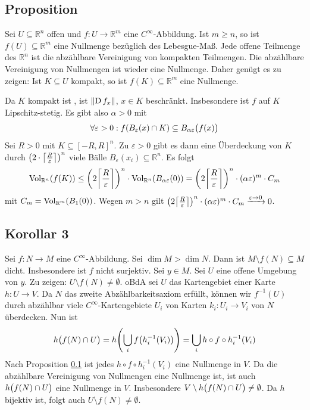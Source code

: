 \subsection{Proposition} %
\label{sub:175}
Sei $U \subseteq \mathds{R}^n$ offen und $f : U \to \mathds{R}^m$ eine $C^\infty$-Abbildung. Ist $m \ge n$, so ist $f(U) \subseteq \mathds{R}^m$ eine Nullmenge bezüglich
des Lebesgue-Maß.
Jede offene Teilmenge des $\mathds{R}^n$ ist die abzählbare Vereinigung von kompakten Teilmengen. Die abzählbare Vereinigung von Nullmengen ist wieder eine Nullmenge. Daher
genügt es zu zeigen: Ist $K \subseteq U$ kompakt, so ist $f(K) \subseteq \mathds{R}^m$ eine Nullmenge. 

Da $K$ kompakt ist , ist $\norm{\D f_x} $, $x \in K$ beschränkt. Insbesondere ist $f$ auf $K$ Lipschitz-stetig. Es gibt also $\alpha >0$ mit 
\[
	\forall \varepsilon > 0 : f \enbrace*{B_\varepsilon(x) \cap K} \subseteq B_{\alpha \varepsilon} \enbrace[\big]{f(x)}  
\]
Sei $R >0$ mit $K \subseteq [-R,R]^n$. Zu $\varepsilon>0$ gibt es dann eine Überdeckung von $K$ durch $\enbrace*{2 \cdot  \ceil*{\frac{R}{\varepsilon}} }^n$ viele Bälle 
$B_\varepsilon(x_i) \subseteq \mathds{R}^n$. Es folgt 
\[
	\Vol_{\mathds{R}^n}\enbrace*{f(K)} \le \enbrace*{2 \ceil*{\frac{R}{\varepsilon}}  }^n \cdot \Vol_{\mathds{R}^n} \enbrace*{B_{\alpha \varepsilon}(0)} =   
	\enbrace*{2 \ceil*{\frac{R}{\varepsilon}}  }^n \cdot (\alpha \varepsilon)^m \cdot C_m
\]
mit $C_m = \Vol_{\mathds{R}^m}(B_1(0))$. Wegen $m >n$ gilt 
$\enbrace*{2 \ceil*{\frac{R}{\varepsilon}}  }^n \cdot (\alpha \varepsilon)^m \cdot C_m \xrightarrow{\varepsilon \to 0} 0 $. \bewende

\subsection{Korollar 3} %
\label{sub:176}
Sei $f : N \to M$ eine $C^\infty$-Abbildung. Sei $\dim M > \dim N$. Dann ist $M \setminus f(N) \subseteq M$ dicht. Insbesondere ist $f$ nicht surjektiv.
Sei $y \in M$. Sei $U$ eine offene Umgebung von $y$. Zu zeigen: $U \setminus f(N) \not= \emptyset$. oBdA sei $U$ das Kartengebiet einer Karte $h : U\to V$. Da $N$ das 
zweite Abzählbarkeitsaxiom erfüllt, können wir $f ^{-1}(U)$ durch abzählbar viele $C^\infty$-Kartengebiete $U_i$ von Karten $k_i : U_i \to V_i$ von $N$ überdecken. Nun ist
\[
	h \enbrace[\big]{f(N) \cap U}  = h \enbrace*{\bigcup_{i} f\enbrace*{h_i ^{-1}(V_i)}} = \bigcup_i h \circ f \circ h_i ^{-1} (V_i)
\]
Nach Proposition \ref{sub:175} ist jedes $h \circ f \circ h_i ^{-1}(V_i)$ eine Nullmenge in $V$. Da die abzählbare Vereinigung von Nullmengen eine Nullmenge ist, ist auch
$h \enbrace[\big]{f(N) \cap U}$ eine Nullmenge in $V$. Insbesondere $V \setminus h \enbrace[\big]{f(N)\cap U} \not= \emptyset$. Da $h$ bijektiv ist, folgt auch 
$U \setminus f(N) \not= \emptyset$. \bewende


